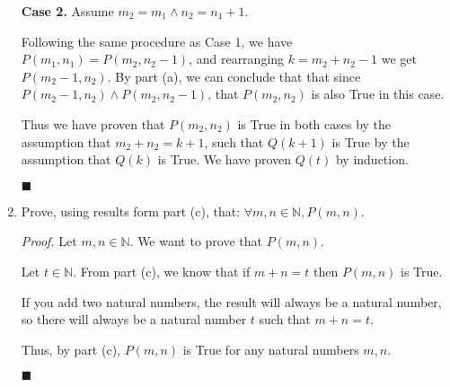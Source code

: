 \documentclass{article}
\newcommand\qedsymbol{\hfill$\blacksquare$}
\begin{document}
\begin{enumerate}[label = (\alph*)]
        \textbf{Case 2.} Assume $m_2 = m_1 \land n_2 = n_1 + 1$.

        Following the same procedure as Case 1, we have 
        $P (m_1, n_1) = P (m_2, n_2 - 1 )$, and rearranging $k = m_2 + n_2 - 1$ 
        we get $P ( m_2 -1, n_2)$. By part (a), we can conclude that 
        that since $P (m_2 -1, n_2) \land P( m_2, n_2 -1)$, that 
        $P (m_2, n_2)$ is also True in this case.

        Thus we have proven that $P (m_2, n_2)$ is True in both cases
        by the assumption that $m_2 + n_2 = k + 1$, such that $Q(k+1)$ is 
        True by the assumption that $Q (k)$ is True. We have 
        proven $Q (t)$ by induction.

        \qedsymbol

    \item Prove, using results form part (c), that: $\forall m, n \in \mathbb{N}, 
        P (m, n)$.

        \textit{Proof.} Let $m, n \in \mathbb{N}$. We want to prove 
        that $P ( m , n)$. 

        Let $t \in \mathbb{N}$. From part (c), we know that if $m + n = t$ 
        then $P ( m, n)$ is True. 

        If you add two natural numbers, the result will always be a 
        natural number, so there will always be a natural number $t$ such 
        that $m + n = t$. 

        Thus, by part (c), $P (m, n)$ is True for any natural numbers 
        $m, n$. 

        \qedsymbol


\end{enumerate}
\end{document}
